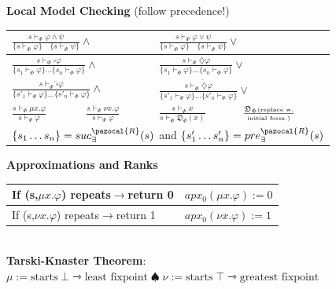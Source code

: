 \documentclass{article}
\newcommand{\Rb}{\pazocal{R}}
\newcommand{\Db}{\mathfrak{D}}
\begin{document}
\begin{multicols}{4}
\textbf{Local Model Checking} (follow precedence!)
\begin{tabular}{|l|l|l|l|}
\hline
\multicolumn{2}{|l|}{\small$\frac{s \vdash_{\Phi} \varphi \wedge \psi}{\{s \vdash_{\Phi} \varphi \} \quad \{s \vdash_{\Phi} \psi\}} \wedge$} & \multicolumn{2}{|l|}{\small$\frac{s \vdash_{\Phi} \varphi \vee \psi}{\{s \vdash_{\Phi} \varphi \} \quad \{s \vdash_{\Phi} \psi\}} \vee $}\\ \hline
\multicolumn{2}{|l|}{\small$\frac{s \vdash_{\Phi} \square \varphi}{\{s_1 \vdash_{\Phi} \varphi\} \dots \{s_n \vdash_{\Phi} \varphi\}} \wedge$}&\multicolumn{2}{|l|}{\small$\frac{s \vdash_{\Phi} \diamondsuit \varphi}{\{s_1 \vdash_{\Phi} \varphi\} \dots \{s_n \vdash_{\Phi} \varphi\}} \vee$} \\
 \hline
\multicolumn{2}{|l|}{\small$\frac{s \vdash_{\Phi} \overleftarrow{\square} \varphi}{\{s'_1 \vdash_{\Phi} \varphi \}\dots \{ s'_n \vdash_{\Phi} \varphi\}} \wedge$} &\multicolumn{2}{|l|}{\small$\frac{s \vdash_{\Phi} \overleftarrow{\diamondsuit} \varphi}{\{s'_1 \vdash_{\Phi} \varphi \}\dots \{ s'_n \vdash_{\Phi} \varphi\}} \vee$} \\
 \hline
$\frac{s \vdash_{\Phi} \mu x.\varphi}{s \vdash_{\Phi} \varphi}$ &$\frac{s \vdash_{\Phi} \nu x.\varphi}{s \vdash_{\Phi} \varphi}$&$\frac{s \vdash_{\Phi} x}{s \vdash_{\Phi} \Db_{\Phi}(x)}$&$\frac{\Db_{\Phi}\text{\tiny (replace w.}}{\text{\tiny initial form.)}}$\\
 \hline
\multicolumn{4}{|l|}{$\{s_1 \dots s_n \}=suc^{\Rb}_{\exists}({s})$ and $\{s'_1 \dots s'_n \}=pre^{\Rb}_{\exists}({s})$}\\ \hline 
\end{tabular}
\textbf{Approximations and Ranks}
\begin{tabular}{|l|l|}
\hline
If (s,$\mu x.\varphi$) repeats$\rightarrow$return 0&$apx_0(\mu x.\varphi):=0$\\ \hline
If (s,$\nu x.\varphi$) repeats$\rightarrow$return 1& $apx_0(\nu x.\varphi):=1$\\ \hline
\end{tabular} \\


\textbf{Tarski-Knaster Theorem}: $\mu := \text{starts} \; \bot \rightarrowtriangle \text{least fixpoint} \;\spadesuit \; \nu :=\text{starts} \;\top \rightarrowtriangle \text{greatest fixpoint}$


\end{multicols}
\end{document}
